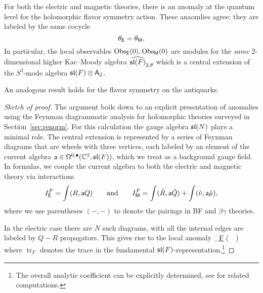 \documentclass[11pt]{amsart}
\def\sfa{\mathsf{a}}
\renewcommand{\op}{\operatorname}
\begin{document}
\begin{prop}
For both the electric and magnetic theories, there is an anomaly at the quantum level for the holomorphic flavor symmetry action.
These anaomlies agree: they are labeled by the same cocycle 
\[
\theta_\sfE = \theta_\sfM.
\] 
In particular, the local observables $\Obs_{\sfE} (0), \Obs_{\sfM} (0)$ are modules for the {\em same} $2$-dimensional higher Kac--Moody algebra $\Hat{\sl(F)}_{2,\theta}$ which is a central extension of the $S^3$-mode algebra $\sl(F) \otimes \sfA_2$.
\end{prop}

An analogous result holds for the flavor symmetry on the antiquarks. 

\begin{proof}[Sketch of proof]
The argument boils down to an explicit presentation of anomalies using the Feynman diagrammatic analysis for holomorphic theories surveyed in Section~\ref{sec:renorm}. 
For this calculation the gauge algebra $\sl(N)$ plays a minimal role. 
The central extension is represented by a series of Feynman diagrams that are wheels with three vertices, each labeled by an element of the current algebra $\sfa \in \Omega^{0,\bu}(\CC^2, \sl(F))$, which we treat as a background gauge field.
In formulas, we couple the current algebra to both the electric and magnetic theory via interactions
\[
I^F_\sfE = \int (R, \sfa Q)  \qquad\text{and}\qquad I^F_\sfM = \int (\check{R}, \sfa \check{Q}) + \int (\check{\nu}, \sfa \check{\mu}),
\]
where we use parentheses $(-,-)$ to denote the pairings in BF and $\beta\gamma$ theories.

In the electric case there are $N$ such diagrams, with all the internal edges are labeled by $Q-R$ propagators. 
This gives rise to the local anomaly
\beqn\label{eqn:electricflavor}
  \int \op{tr}_{\underline{F}} \left(\sfa \, \partial \sfa \, \partial \sfa\right) 
\eeqn
where $\op{tr}_{\underline{F}}$ denotes the trace in the fundamental $\sl(F)$-representation.\footnote{The overall analytic coefficient can be explicitly determined, see \cite{GWkm} for related computations.}


\end{proof}
\end{document}
